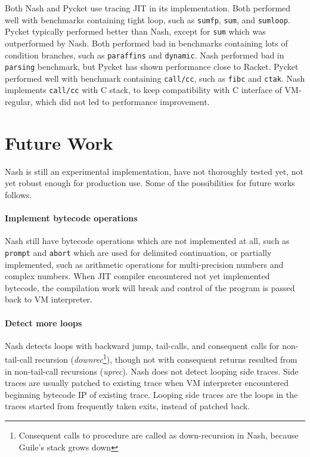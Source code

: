 \documentclass[preprint]{sigplanconf}
\begin{document}
Both Nash and Pycket use tracing JIT in its implementation. Both performed
well with benchmarks containing tight loop, such as \texttt{sumfp},
\texttt{sum}, and \texttt{sumloop}. Pycket typically performed better than
Nash, except for \texttt{sum} which was outperformed by Nash. Both performed
bad in benchmarks containing lots of condition branches, such as
\texttt{paraffins} and \texttt{dynamic}. Nash performed bad in
\texttt{parsing} benchmark, but Pycket has shown performance close to
Racket. Pycket performed well with benchmark containing \texttt{call/cc}, such
as \texttt{fibc} and \texttt{ctak}. Nash implements \texttt{call/cc} with C
stack, to keep compatibility with C interface of VM-regular, which did not led
to performance improvement.

\section{Future Work}
\label{sec:future}

Nash is still an experimental implementation, have not thoroughly tested yet,
not yet robust enough for production use. Some of the possibilities for future
works follows.

\paragraph{Implement bytecode operations} Nash still have bytecode
operations which are not implemented at all, such as \texttt{prompt} and
\texttt{abort} which are used for delimited continuation, or partially
implemented, such as arithmetic operations for multi-precision numbers and
complex numbers. When JIT compiler encountered not yet implemented bytecode,
the compilation work will break and control of the program is passed back to
VM interpreter.

\paragraph{Detect more loops} Nash detects loops with backward jump,
tail-calls, and consequent calls for non-tail-call recursion
(\textit{downrec}\footnote{Consequent calls to procedure are called as
  down-recursion in Nash, because Guile's stack grows down}), though not with
consequent returns resulted from in non-tail-call recursions
(\textit{uprec}). Nash does not detect looping side traces. Side traces are
usually patched to existing trace when VM interpreter encountered beginning
bytecode IP of existing trace. Looping side traces are the loops in the traces
started from frequently taken exits, instead of patched back.
\end{document}
